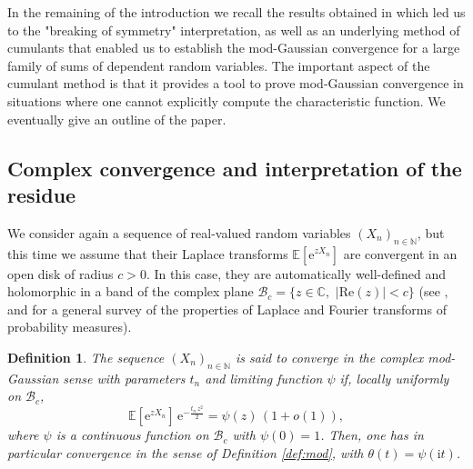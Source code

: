 \documentclass[12pt,a4paper,reqno]{amsart}
\newcommand{\N}{\mathbb{N}}
\newcommand{\CC}{\mathbb{C}}
\newcommand{\E}{\mathrm{e}}
\newcommand{\I}{\mathrm{i}}
\newcommand{\esper}{\mathbb{E}}
\newtheorem{definition}[theorem]{Definition}
\theoremstyle{remark}
\begin{document}
In the remaining of the introduction we recall the results obtained in \cite{FMN13} which led us to the "breaking of symmetry" interpretation, as well as an underlying method of cumulants that enabled us to establish the mod-Gaussian convergence for a large family of sums of dependent random variables. The important aspect of the cumulant method is that it provides a tool to prove mod-Gaussian convergence in situations where one cannot explicitly compute the characteristic function. We eventually give an outline of the paper.
\medskip



\subsection{Complex convergence and interpretation of the residue}\label{subsec:brisesymm}
We consider again a sequence of real-valued random variables $(X_n)_{n \in \N}$, but this time we assume that their Laplace transforms $\esper[\E^{zX_n}]$ are convergent in an open disk of radius $c>0$. In this case, they are automatically well-defined and holomorphic in a band of the complex plane $\mathcal{B}_c = \{z \in \CC,\,\,|\mathrm{Re}(z)|<c\}$ (see \cite[Theorem 6]{LS52}, and \cite{Ess45} for a general survey of the properties of Laplace and Fourier transforms of probability measures).\medskip

\begin{definition}\label{def:mod2}
The sequence $(X_n)_{n \in \N}$ is said to converge in the complex mod-Gaussian sense with parameters $t_n$ and limiting function $\psi$ if, locally uniformly on $\mathcal{B}_c$,
$$\esper[\E^{z X_n}]\,\E^{-\frac{t_n\,z^2}{2}} = \psi(z) \,(1+o(1)),$$
where $\psi$ is a continuous function on $\mathcal{B}_c$ with $\psi(0)=1$. Then, one has in particular convergence in the sense of Definition \ref{def:mod}, with $\theta(t)=\psi(\I t)$.
\end{definition}
\end{document}
